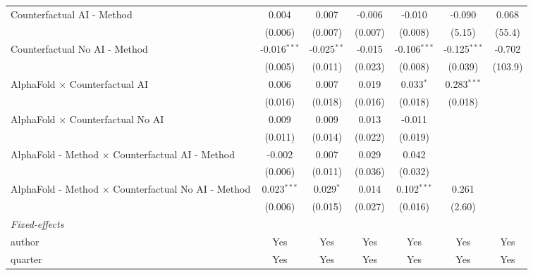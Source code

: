 \begin{tabular}{lcccccc}
   Counterfactual AI - Method                                 & 0.004          & 0.007         & -0.006  & -0.010         & -0.090         & 0.068\\   
                                                              & (0.006)        & (0.007)       & (0.007) & (0.008)        & (5.15)         & (55.4)\\   
   Counterfactual No AI - Method                              & -0.016$^{***}$ & -0.025$^{**}$ & -0.015  & -0.106$^{***}$ & -0.125$^{***}$ & -0.702\\   
                                                              & (0.005)        & (0.011)       & (0.023) & (0.008)        & (0.039)        & (103.9)\\   
   AlphaFold $\times$ Counterfactual AI                       & 0.006          & 0.007         & 0.019   & 0.033$^{*}$    & 0.283$^{***}$  &   \\   
                                                              & (0.016)        & (0.018)       & (0.016) & (0.018)        & (0.018)        &   \\   
   AlphaFold $\times$ Counterfactual No AI                    & 0.009          & 0.009         & 0.013   & -0.011         &                &   \\   
                                                              & (0.011)        & (0.014)       & (0.022) & (0.019)        &                &   \\   
   AlphaFold - Method $\times$ Counterfactual AI - Method     & -0.002         & 0.007         & 0.029   & 0.042          &                &   \\   
                                                              & (0.006)        & (0.011)       & (0.036) & (0.032)        &                &   \\   
   AlphaFold - Method $\times$ Counterfactual No AI - Method  & 0.023$^{***}$  & 0.029$^{*}$   & 0.014   & 0.102$^{***}$  & 0.261          &   \\   
                                                              & (0.006)        & (0.015)       & (0.027) & (0.016)        & (2.60)         &   \\   
   \midrule
   \emph{Fixed-effects}\\
   author                                                     & Yes            & Yes           & Yes     & Yes            & Yes            & Yes\\  
   quarter                                                    & Yes            & Yes           & Yes     & Yes            & Yes            & Yes\\  

\end{tabular}
